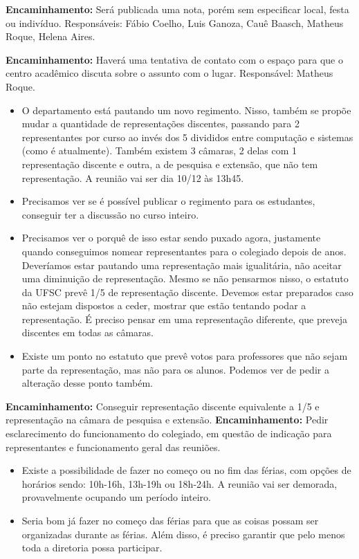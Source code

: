 \documentclass{ata-calico}
\begin{document}
\textbf{Encaminhamento:} Será publicada uma nota, porém sem especificar local, festa ou indivíduo. Responsáveis: Fábio Coelho, Luis Ganoza, Cauê Baasch, Matheus Roque, Helena Aires.

\textbf{Encaminhamento:} Haverá uma tentativa de contato com o espaço para que o centro acadêmico discuta sobre o assunto com o lugar. Responsável: Matheus Roque.

\begin{itemize}
\item O departamento está pautando um novo regimento. Nisso, também se propõe mudar a quantidade de representações discentes, passando para 2 representantes por curso ao invés dos 5 divididos entre computação e sistemas (como é atualmente). Também existem 3 câmaras, 2 delas com 1 representação discente e outra, a de pesquisa e extensão, que não tem representação. A reunião vai ser dia 10/12 às 13h45.
\item Precisamos ver se é possível publicar  o regimento para os estudantes, conseguir ter a discussão no curso inteiro.
\item Precisamos ver o porquê de isso estar sendo puxado agora, justamente quando conseguimos nomear representantes para o colegiado depois de anos. Deveríamos estar pautando uma representação mais igualitária, não aceitar uma diminuição de representação. Mesmo se não pensarmos nisso, o estatuto da UFSC prevê 1/5 de representação discente. Devemos estar preparados caso não estejam dispostos a ceder, mostrar que estão tentando podar a representação. É preciso pensar em uma representação diferente, que preveja discentes em todas as câmaras.
\item Existe um ponto no estatuto que prevê votos para professores que não sejam parte da representação, mas não para os alunos. Podemos ver de pedir a alteração desse ponto também.
\end{itemize}

\textbf{Encaminhamento:} Conseguir representação discente equivalente a 1/5 e representação na câmara de pesquisa e extensão.
\textbf{Encaminhamento:} Pedir esclarecimento do funcionamento do colegiado, em questão de indicação para representantes e funcionamento geral das reuniões.

\begin{itemize}
\item Existe a possibilidade de fazer no começo ou no fim das férias, com opções de horários sendo: 10h-16h, 13h-19h ou 18h-24h. A reunião vai ser demorada, provavelmente ocupando um período inteiro.
\item Seria bom já fazer no começo das férias para que as coisas possam ser organizadas durante as férias. Além disso, é preciso garantir que pelo menos toda a diretoria possa participar.
\end{itemize}
\end{document}
